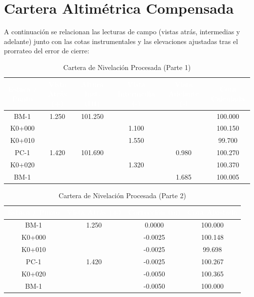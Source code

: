 \documentclass[11pt,letterpaper]{article}
\begin{document}
\section{Cartera Altimétrica Compensada}
A continuación se relacionan las lecturas de campo (vistas atrás, intermedias y adelante) junto con las cotas instrumentales y las elevaciones ajustadas tras el prorrateo del error de cierre:
\begin{table}[H]
  \centering
  \small
  \caption{Cartera de Nivelación Procesada (Parte 1)}
  \label{tab:nivelacion_0}
  \begin{tabular}{|c|c|c|c|c|c|}
    \hline
    \rowcolor{GeoBlue}
    \textcolor{white}{\textbf{Estaca / Punto}} & \textcolor{white}{\textbf{Vista Atrás (+)}} & \textcolor{white}{\textbf{Altura Inst. (HI)}} & \textcolor{white}{\textbf{Vista Intermedia (-)}} & \textcolor{white}{\textbf{Vista Adelante (-)}} & \textcolor{white}{\textbf{Cota Calculada}} \\
    \hline
    \rowcolor{GeoBlue!5}
    BM-1 & 1.250 & 101.250 &  &  & 100.000 \\
    \hline
    \rowcolor{white}
    K0+000 &  &  & 1.100 &  & 100.150 \\
    \hline
    \rowcolor{GeoBlue!5}
    K0+010 &  &  & 1.550 &  & 99.700 \\
    \hline
    \rowcolor{white}
    PC-1 & 1.420 & 101.690 &  & 0.980 & 100.270 \\
    \hline
    \rowcolor{GeoBlue!5}
    K0+020 &  &  & 1.320 &  & 100.370 \\
    \hline
    \rowcolor{white}
    BM-1 &  &  &  & 1.685 & 100.005 \\
    \hline
  \end{tabular}
\end{table}
\vspace{0.8cm}
\begin{table}[H]
  \centering
  \small
  \caption{Cartera de Nivelación Procesada (Parte 2)}
  \label{tab:nivelacion_1}
  \begin{tabular}{|c|c|c|c|}
    \hline
    \rowcolor{GeoBlue}
    \textcolor{white}{\textbf{Estaca / Punto}} & \textcolor{white}{\textbf{Vista Atrás (+)}} & \textcolor{white}{\textbf{Corrección (m)}} & \textcolor{white}{\textbf{Cota Ajustada}} \\
    \hline
    \rowcolor{GeoBlue!5}
    BM-1 & 1.250 & 0.0000 & 100.000 \\
    \hline
    \rowcolor{white}
    K0+000 &  & -0.0025 & 100.148 \\
    \hline
    \rowcolor{GeoBlue!5}
    K0+010 &  & -0.0025 & 99.698 \\
    \hline
    \rowcolor{white}
    PC-1 & 1.420 & -0.0025 & 100.267 \\
    \hline
    \rowcolor{GeoBlue!5}
    K0+020 &  & -0.0050 & 100.365 \\
    \hline
    \rowcolor{white}
    BM-1 &  & -0.0050 & 100.000 \\
    \hline
  \end{tabular}
\end{table}
\vspace{0.8cm}
\end{document}

